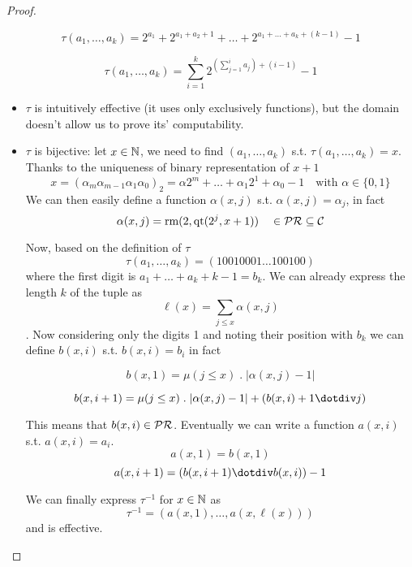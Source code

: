 \begin{lemma}
\begin{proof}
\begin{enumerate}[label=(\arabic*)]
{        \[\tau (a_1, \dots, a_k ) = 2^{a_1}+2^{a_1+a_2+1}+ \dots +
          2^{a_1+\dots + a_k + (k-1)} - 1\]

        \[\tau (a_1, \dots, a_k ) = \sum^k_{i=1}2^{(\sum_{j=1}^i a_j)
            + (i-1)}-1\]

        \begin{itemize}
        \item $\tau$ is intuitively effective (it uses only
          exclusively functions), but the domain doesn't allow us to
          prove its' computability.
        \item $\tau$ is bijective: let $x \in \mathbb{N}$, we need to find
          $(a_1, \dots, a_k)$ s.t. $\tau(a_1,\dots,a_k) = x$. Thanks
          to the uniqueness of binary representation of $x+1$
          \[x = (\alpha_m \alpha_{m-1} \alpha_1 \alpha_0)_2 = \alpha
            2^m + \dots + \alpha_1 2^1 + \alpha_0 - 1 \quad \text{with
            } \alpha \in \{0,1\} \] We can then easily define a
          function $\alpha(x,j)$ s.t. $\alpha(x,j) = \alpha_j$, in
          fact
          \[\alpha(x, j) = \text{rm}(2, \text{qt}(2^j, x+1)) \quad \in
            \mathcal{PR} \subseteq \mathcal{C}\]

          Now, based on the definition of $\tau$
          \[\tau(a_1, \dots, a_k) = (1 0 0 1 0 0 0 1 \dots 1 0 0 1 0
            0)\] where the first digit is $a_1+\dots+a_k+k-1 =
          b_k$. We can already express the length $k$ of the tuple
          as \[\ell (x) = \sum_{j \leq x}\alpha(x,j)\]. Now considering
          only the digits 1 and noting their position with $b_k$ we
          can define $b(x,i)$ s.t. $b(x,i) = b_i$ in fact

          \[b(x,1) = \mu(j \leq x) \; . \; |\alpha(x,j) - 1|\]

          \[b(x,i+1) = \mu(j \leq x) \; . \; |\alpha(x,j)-1| +
            (b(x,i)+1 \dotdiv j)\]

          This means that $b(x,i)\in \mathcal{PR}$.  Eventually we can write a
          function $a(x,i)$ s.t. $a(x,i) = a_i$.
          \[a(x,1) = b(x,1)\]
          \[a(x,i+1) = (b(x,i+1) \dotdiv b(x,i))-1\]

          We can finally express $\tau^{-1}$ for $x \in \mathbb{N}$ as
          \[\tau^{-1} = (a(x,1), \dots, a(x, \ell(x)))\] and is
          effective.
        \end{itemize}
      }
    \end{enumerate}
  \end{proof}
\end{lemma}

